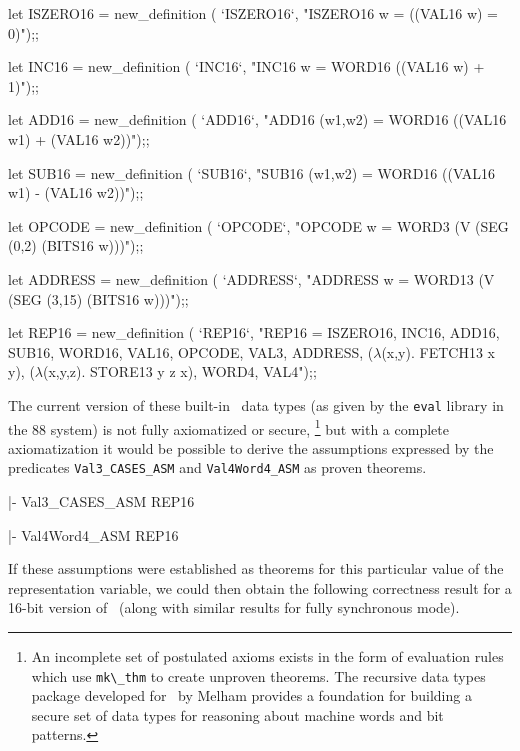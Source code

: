 let ISZERO16 = new_definition (
  `ISZERO16`,
  "ISZERO16 w = ((VAL16 w) = 0)");;

let INC16 = new_definition (
  `INC16`,
  "INC16 w = WORD16 ((VAL16 w) + 1)");;

let ADD16 = new_definition (
  `ADD16`,
  "ADD16 (w1,w2) = WORD16 ((VAL16 w1) + (VAL16 w2))");;

let SUB16 = new_definition (
  `SUB16`,
  "SUB16 (w1,w2) = WORD16 ((VAL16 w1) - (VAL16 w2))");;

let OPCODE = new_definition (
  `OPCODE`,
  "OPCODE w = WORD3 (V (SEG (0,2) (BITS16 w)))");;

let ADDRESS = new_definition (
  `ADDRESS`,
  "ADDRESS w = WORD13 (V (SEG (3,15) (BITS16 w)))");;

let REP16 = new_definition (
  `REP16`,
  "REP16 =
    ISZERO16,                             %
    INC16,                                %
    ADD16,                                %
    SUB16,                                %
    WORD16,                               %
    VAL16,                                %
    OPCODE,                               %
    VAL3,                                 %
    ADDRESS,                              %
    (\(\lambda\)(x,y). FETCH13 x y),                %
    (\(\lambda\)(x,y,z). STORE13 y z x),            %
    WORD4,                                %
    VAL4");;                              %
\endtt

The current version of these built-in \HOL\ data types
(as given by the \verb"eval" library in the {\HOL}88 system)
is not fully axiomatized or secure,
\footnote{
An incomplete set of postulated axioms exists in the form of
evaluation rules which use \verb"mk\_thm" to create unproven theorems.
The recursive data types package developed for \HOL\ by Melham
\cite{Melham:thesis} provides a foundation for building a secure
set of data types for reasoning about machine words and bit patterns.}
but with a complete axiomatization it would be possible to
derive the assumptions
expressed by the predicates \verb"Val3_CASES_ASM" and \verb"Val4Word4_ASM"
as proven theorems.

\begintt
|- Val3_CASES_ASM REP16

|- Val4Word4_ASM REP16
\endtt

If these assumptions were established as theorems for this particular
value of the representation variable,
we could then obtain the following correctness result for a 16-bit version
of \Tamarack\ (along with similar results for fully synchronous mode).

